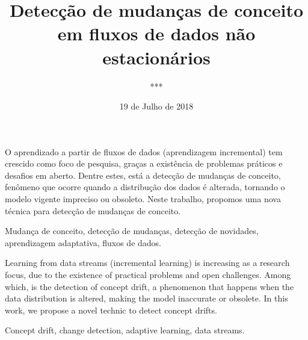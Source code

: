 \documentclass[qual, classic, a4paper]{ufbathesis}
\institute{Instituto de Matem\'{a}tica}
\title{Detecção de mudanças de conceito em fluxos de dados não estacionários}
\date{19 de Julho de 2018}
\author{***}
\begin{document}
\pgcompfrontpage

\frontmatter

\pgcomppresentationpage



\resumo
O aprendizado a partir de fluxos de dados (aprendizagem incremental) tem crescido como foco de pesquisa, graças a existência de problemas práticos e desafios em aberto.
Dentre estes, está a detecção de mudanças de conceito, fenômeno que ocorre quando a distribução dos dados é alterada, tornando o modelo vigente impreciso ou obsoleto.
Neste trabalho, propomos uma nova técnica para detecção de mudanças de conceito.

\begin{keywords}
Mudança de conceito, detecção de mudanças, detecção de novidades, aprendizagem adaptativa, fluxos de dados.
\end{keywords}


\abstract
Learning from data streams (incremental learning) is increasing as a research focus, due to the existence of practical problems and open challenges. Among which, is the detection of concept drift, a phenomenon that happens when the data distribution is altered, making the model inaccurate or obsolete. In this work, we propose a novel technic to detect concept drifts.

\begin{keywords}
Concept drift, change detection, adaptive learning, data streams.
\end{keywords}


\tableofcontents




\end{document}
